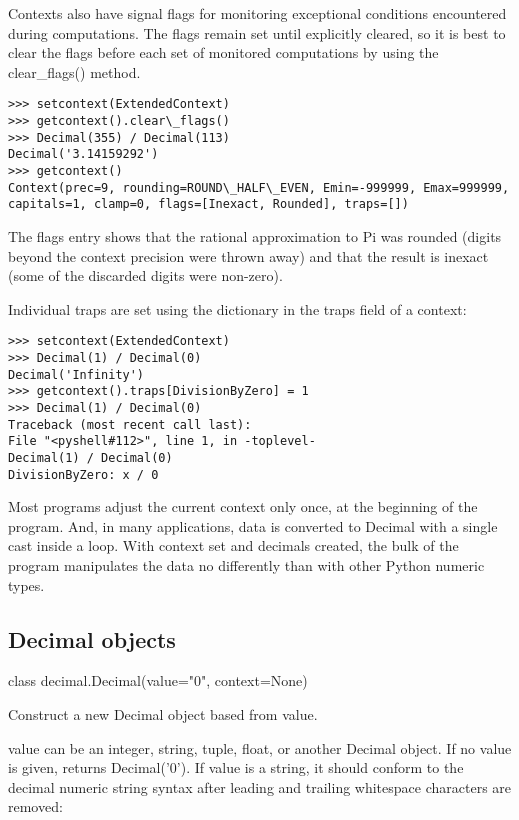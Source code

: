 Contexts also have signal flags for monitoring exceptional conditions encountered during computations. The flags remain set until explicitly cleared, so it is best to clear the flags before each set of monitored computations by using the clear\_flags() method.

\begin{lstlisting}
>>> setcontext(ExtendedContext)
>>> getcontext().clear\_flags()
>>> Decimal(355) / Decimal(113)
Decimal('3.14159292')
>>> getcontext()
Context(prec=9, rounding=ROUND\_HALF\_EVEN, Emin=-999999, Emax=999999,
capitals=1, clamp=0, flags=[Inexact, Rounded], traps=[])
\end{lstlisting}

The flags entry shows that the rational approximation to Pi was rounded (digits beyond the context precision were thrown away) and that the result is inexact (some of the discarded digits were non-zero).

Individual traps are set using the dictionary in the traps field of a context:

\begin{lstlisting}
>>> setcontext(ExtendedContext)
>>> Decimal(1) / Decimal(0)
Decimal('Infinity')
>>> getcontext().traps[DivisionByZero] = 1
>>> Decimal(1) / Decimal(0)
Traceback (most recent call last):
File "<pyshell#112>", line 1, in -toplevel-
Decimal(1) / Decimal(0)
DivisionByZero: x / 0
\end{lstlisting}

Most programs adjust the current context only once, at the beginning of the program. And, in many applications, data is converted to Decimal with a single cast inside a loop. With context set and decimals created, the bulk of the program manipulates the data no differently than with other Python numeric types.



\subsection{Decimal objects}

class decimal.Decimal(value="0", context=None)

Construct a new Decimal object based from value.

value can be an integer, string, tuple, float, or another Decimal object. If no value is given, returns Decimal('0'). If value is a string, it should conform to the decimal numeric string syntax after leading and trailing whitespace characters are removed:

